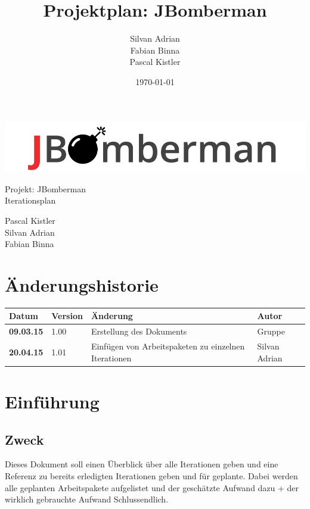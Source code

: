 \documentclass[11pt]{scrartcl}
\title{Projektplan: JBomberman}
\author{Silvan Adrian \\ Fabian Binna \\ Pascal Kistler}
\date{\today{}}
\begin{document}
\def\arraystretch{1.5}
\begin{titlepage}
\begin{center}
\vspace{10em}
\includegraphics[scale=2]{jbomberman}
\vspace{10em}
\end{center}
\begin{center}
\huge {Projekt: JBomberman} \\
\huge {Iterationsplan}
\end{center}
\begin{center}
\vspace{10em}
\LARGE {Pascal Kistler} \\
\LARGE {Silvan Adrian} \\
\LARGE {Fabian Binna}
\end{center}

\end{titlepage}

\newpage
\section{Änderungshistorie}
\label{sec:Änderungen}

\begin{tabularx}{\linewidth}{l l X l}
\textbf{Datum} & \textbf{Version} & \textbf{Änderung}  & \textbf{Autor} \\
\hline
\textbf{09.03.15} & 1.00 & Erstellung des Dokuments & Gruppe \\
\bf{20.04.15} & 1.01 & Einfügen von Arbeitspaketen zu einzelnen Iterationen & 
Silvan Adrian
\end{tabularx}

\newpage
\tableofcontents
\newpage
\section{Einführung}
\subsection{Zweck}
Dieses Dokument soll einen Überblick über alle Iterationen geben und eine 
Referenz zu bereits erledigten Iterationen geben und für geplante.
Dabei werden alle geplanten Arbeitspakete aufgelistet und der geschätzte Aufwand 
dazu + der wirklich gebrauchte Aufwand Schlussendlich.
\end{document}
